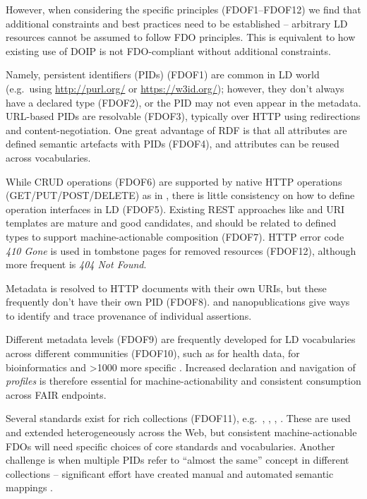 However, when considering the specific principles (FDOF1--FDOF12) we
find that additional constraints and best practices need to be
established -- arbitrary LD resources cannot be assumed to follow FDO
principles. This is equivalent to how existing use of DOIP is not
FDO-compliant without additional constraints.

Namely, persistent identifiers (PIDs) \cite{McMurry 2017}
(FDOF1) are common in LD world (e.g.~using \url{http://purl.org/} or
\url{https://w3id.org/}); however, they don't always have a declared type
(FDOF2), or the PID may not even appear in the metadata. URL-based PIDs
are resolvable (FDOF3), typically over HTTP using redirections and
content-negotiation. One great advantage of RDF is that all attributes
are defined semantic artefacts with PIDs (FDOF4), and attributes can be
reused across vocabularies.

While CRUD operations (FDOF6) are supported by native HTTP operations
(GET/PUT/POST/DELETE) as in ,
there is little consistency on how to define operation interfaces in LD
(FDOF5). Existing REST approaches like
 \cite{OpenAPISpecificationV3} and
URI templates \cite{rfc6570} are mature and
good candidates, and should be related to defined types to support
machine-actionable composition (FDOF7). HTTP error code \emph{410 Gone}
is used in tombstone pages for removed resources (FDOF12), although more
frequent is \emph{404 Not Found}.

Metadata is resolved to HTTP documents with their own URIs, but these
frequently don't have their own PID (FDOF8).
 and nanopublications
\cite{Kuhn 2021} give ways
to identify and trace provenance of individual assertions.

Different metadata levels (FDOF9) are frequently developed for LD
vocabularies across different communities (FDOF10), such as
 for health data,
 for bioinformatics and
\textgreater1000 more specific
.
Increased declaration and navigation of \emph{profiles} is therefore
essential for machine-actionability and consistent consumption across
FAIR endpoints.

Several standards exist for rich collections (FDOF11),
e.g.~,
,
,
. These are used and extended
heterogeneously across the Web, but consistent machine-actionable FDOs
will need specific choices of core standards and vocabularies. Another
challenge is when multiple PIDs refer to ``almost the same'' concept in
different collections -- significant effort have created manual and
automated semantic mappings \cite{Baker 2013,de Mello 2022}.

